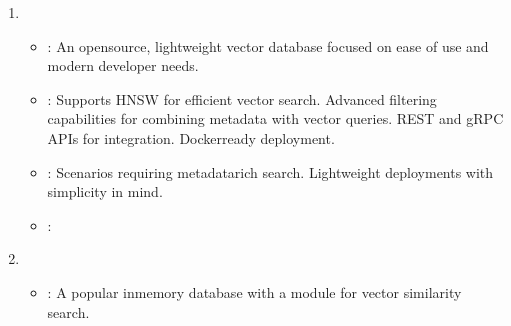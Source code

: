 \documentclass[letterpaper,11pt,english]{sphinxmanual}
\begin{document}
\begin{enumerate}
\begin{itemize}
\item {} 
\sphinxAtStartPar
{}:
\sphinxhyphen{} Distributed and scalable architecture.
\sphinxhyphen{} Integration with FAISS, Annoy, and HNSW indexing techniques.
\sphinxhyphen{} Built\sphinxhyphen{}in support for time travel queries (searching historical data).

\item {} 
\sphinxAtStartPar
{}:
\sphinxhyphen{} Video, audio, and image search applications.
\sphinxhyphen{} Large\sphinxhyphen{}scale datasets requiring real\sphinxhyphen{}time indexing and retrieval.

\item {} 
\sphinxAtStartPar
{}: 

\end{itemize}

\item {} 
\sphinxAtStartPar
{}
\begin{itemize}
\item {} 
\sphinxAtStartPar
{}:
\sphinxhyphen{} An open\sphinxhyphen{}source, lightweight vector database focused on ease of use and modern developer needs.

\item {} 
\sphinxAtStartPar
{}:
\sphinxhyphen{} Supports HNSW for efficient vector search.
\sphinxhyphen{} Advanced filtering capabilities for combining metadata with vector queries.
\sphinxhyphen{} REST and gRPC APIs for integration.
\sphinxhyphen{} Docker\sphinxhyphen{}ready deployment.

\item {} 
\sphinxAtStartPar
{}:
\sphinxhyphen{} Scenarios requiring metadata\sphinxhyphen{}rich search.
\sphinxhyphen{} Lightweight deployments with simplicity in mind.

\item {} 
\sphinxAtStartPar
{}: 

\end{itemize}

\item {} 
\sphinxAtStartPar
{}
\begin{itemize}
\item {} 
\sphinxAtStartPar
{}:
\sphinxhyphen{} A popular in\sphinxhyphen{}memory database with a module for vector similarity search.


\end{itemize}
\end{enumerate}
\end{document}

